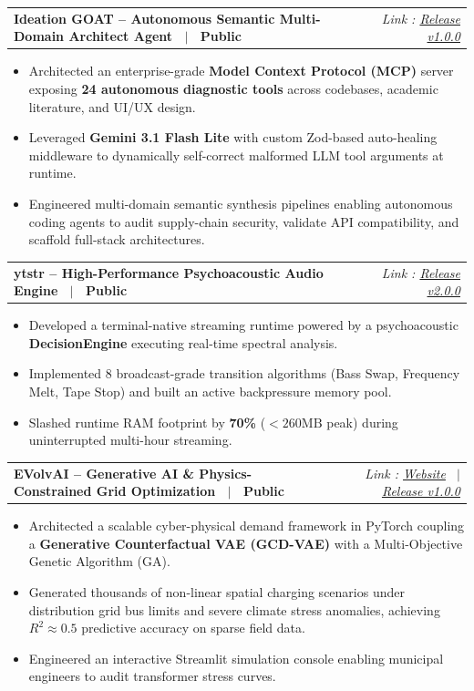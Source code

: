 \documentclass[letterpaper,10pt]{article}
\makeatletter
\newcommand{\resumeProjectHeading}[2]{
  \vspace{-2pt}\item
    \begin{tabular*}{\linewidth}[t]{l@{\extracolsep{\fill}}r}
      \textbf{#1} & \textit{\small #2} \\
    \end{tabular*}\vspace{-3pt}
}
\newcommand{\resumeItemListStart}{\begin{itemize}[leftmargin=14pt, labelsep=4pt, itemsep=0.5pt, parsep=0pt]}
\newcommand{\resumeItemListEnd}{\end{itemize}\vspace{-3pt}}
\makeatother
\begin{document}
    \resumeProjectHeading
      {Ideation GOAT -- Autonomous Semantic Multi-Domain Architect Agent \ $|$ \ Public}{Link : \href{https://github.com/seeramsujay/ideation-goat/releases/tag/v1.0.0}{Release v1.0.0}}
      \resumeItemListStart
        \item{Architected an enterprise-grade \textbf{Model Context Protocol (MCP)} server exposing \textbf{24 autonomous diagnostic tools} across codebases, academic literature, and UI/UX design.}
        \item{Leveraged \textbf{Gemini 3.1 Flash Lite} with custom Zod-based auto-healing middleware to dynamically self-correct malformed LLM tool arguments at runtime.}
        \item{Engineered multi-domain semantic synthesis pipelines enabling autonomous coding agents to audit supply-chain security, validate API compatibility, and scaffold full-stack architectures.}
      \resumeItemListEnd

    \resumeProjectHeading
      {ytstr -- High-Performance Psychoacoustic Audio Engine \ $|$ \ Public}{Link : \href{https://github.com/seeramsujay/ytstr/releases/tag/v2}{Release v2.0.0}}
      \resumeItemListStart
        \item{Developed a terminal-native streaming runtime powered by a psychoacoustic \textbf{DecisionEngine} executing real-time spectral analysis.}
        \item{Implemented 8 broadcast-grade transition algorithms (Bass Swap, Frequency Melt, Tape Stop) and built an active backpressure memory pool.}
        \item{Slashed runtime RAM footprint by \textbf{70\%} ($<260\text{MB}$ peak) during uninterrupted multi-hour streaming.}
      \resumeItemListEnd

    \resumeProjectHeading
      {EVolvAI -- Generative AI \& Physics-Constrained Grid Optimization \ $|$ \ Public}{Link : \href{https://EVolvAI.vercel.app}{Website} \ $|$ \ \href{https://github.com/seeramsujay/EVolvAI/releases/tag/v1.0.0}{Release v1.0.0}}
      \resumeItemListStart
        \item{Architected a scalable cyber-physical demand framework in PyTorch coupling a \textbf{Generative Counterfactual VAE (GCD-VAE)} with a Multi-Objective Genetic Algorithm (GA).}
        \item{Generated thousands of non-linear spatial charging scenarios under distribution grid bus limits and severe climate stress anomalies, achieving $R^2 \approx 0.5$ predictive accuracy on sparse field data.}
        \item{Engineered an interactive Streamlit simulation console enabling municipal engineers to audit transformer stress curves.}
      \resumeItemListEnd
\end{document}
